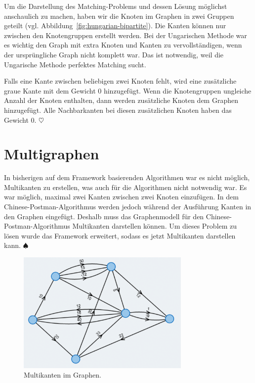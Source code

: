 Um die Darstellung des Matching-Problems und dessen Lösung möglichst anschaulich zu machen, haben wir die Knoten im Graphen in zwei Gruppen geteilt (vgl. Abbildung~\ref{fig:hungarian-bipartite}). Die Kanten können nur zwischen den Knotengruppen erstellt werden. Bei der Ungarischen Methode war es wichtig den Graph mit extra Knoten und Kanten zu vervollständigen, wenn der ursprüngliche Graph nicht komplett war. Das ist notwendig, weil die Ungarische Methode perfektes Matching sucht.

Falls eine Kante zwischen beliebigen zwei Knoten fehlt, wird eine zusätzliche graue Kante mit dem Gewicht 0 hinzugefügt. Wenn die Knotengruppen ungleiche Anzahl der Knoten enthalten, dann werden zusätzliche Knoten dem Graphen hinzugefügt. Alle Nachbarkanten bei diesen zusätzlichen Knoten haben das Gewicht 0. \hfill$\heartsuit$

\section{Multigraphen} %
In bisherigen auf dem Framework basierenden Algorithmen war es nicht möglich, Multikanten zu erstellen, was auch für die Algorithmen nicht notwendig war. Es war möglich, maximal zwei Kanten zwischen zwei Knoten einzufügen. 
In dem Chinese-Postman-Algorithmus werden jedoch während der Ausführung Kanten in den Graphen eingefügt. Deshalb muss das Graphenmodell für den Chinese-Postman-Algorithmus Multikanten darstellen können. Um dieses Problem zu lösen wurde das Framework erweitert, sodass es jetzt Multikanten darstellen kann. \hfill$\spadesuit$
\begin{figure}[h!]
	\centering
	\includegraphics[width=0.75\textwidth]{figures/multigraph}
	\caption[Multigraph]{Multikanten im Graphen.}\label{fig:multigraph}
\end{figure}

